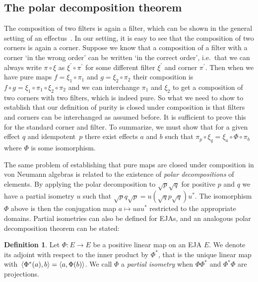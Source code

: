 \documentclass[submission,copyright,creativecommons]{eptcs}
\newcounter{main}
\theoremstyle{definition}
\newtheorem{definition}[main]{Definition}
\DeclarePairedDelimiter{\inn}{\langle}{\rangle}
\begin{document}
\subsection{The polar decomposition theorem}\label{sec:EJApurity}

The composition of two filters is again a filter,
    which can be shown in the general setting of an effectus~\cite[197IX]{basthesis}.
In our setting, it is easy to see that the composition of two corners is again a corner.
Suppose we know that a composition of a filter with a corner `in
the wrong order' can be written `in the correct order', i.e.\ that
we can always write $\pi\circ \xi$ as $\xi^\prime\circ \pi^\prime$
for some different filter $\xi^\prime$ and corner $\pi^\prime$.
Then when we have pure maps $f=\xi_1\circ\pi_1$ and $g=\xi_2\circ\pi_2$
their composition is $f\circ g = \xi_1\circ \pi_1 \circ \xi_2\circ
\pi_2$ and we can interchange $\pi_1$ and $\xi_2$ to get a composition
of two corners with two filters, which is indeed pure. So what we
need to show to establish that our definition of purity is closed
under composition is that filters and corners can be interchanged as assumed before.
It is sufficient to prove this for the standard corner and filter.
To summarize, we must show that for a given effect $q$ and idempotent~$p$
there exist effects $a$ and $b$ such that $\pi_p\circ\xi_q =
\xi_a\circ\Phi\circ \pi_b$ where $\Phi$ is some isomorphism.

The same problem of establishing that pure maps are closed under
composition in von Neumann algebras is related to the existence of
\emph{polar decompositions} of elements. By applying the polar
decomposition to $\sqrt{p}\sqrt{q}$ for positive $p$ and $q$ we
have a partial isometry $u$ such that $\sqrt{p}q\sqrt{p} =
u(\sqrt{q}p\sqrt{q})u^*$. The isomorphism $\Phi$ above is then the
conjugation map $a\mapsto uau^*$ restricted to the appropriate
domains. Partial isometries can also be defined for EJAs, and an analogous polar decomposition theorem can be stated:
\begin{definition}
    Let $\Phi\colon E\rightarrow E$ be a positive linear map on an
    EJA $E$. We denote its adjoint with respect to the inner product
    by $\Phi^*$, that is the unique linear map with~$\inn{\Phi^*(a),b} =
    \inn{a,\Phi(b)}$. We call $\Phi$ a \emph{partial isometry}
    when $\Phi\Phi^*$ and $\Phi^*\Phi$ are projections.
\end{definition}
\end{document}
